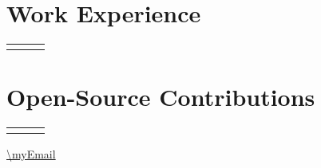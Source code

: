 \documentclass[jdlanctot]{mycv}
\begin{document}
\begin{paracol}{2}
\vspace{2em}

\phantom{turn the page}

\phantom{turn the page}
\switchcolumn
\small
\section*{Work Experience}
\begin{tabular}{r!{\hspace{2mm}\color{titlerulecolour}\vrule width 1pt\hspace{1mm}} p{0.5\textwidth} c}
    \\
    \vspace{-1em}
\end{tabular}
\vspace{1em}

\section*{Open-Source Contributions}
\begin{tabular}{r!{\hspace{2mm}\color{titlerulecolour}\vrule width 1pt\hspace{1mm}} p{0.5\textwidth} c}
    \vspace{-3em}
\end{tabular}
\vspace{1em}

\end{paracol}

\vfill{} %
\setlength{\parindent}{0pt}
\centering
\begin{minipage}[t]{\textwidth}
    \begin{center}\fontfamily{\sfdefault}\selectfont \color{black!70}
    {\small \myName {} \myJob {} \myLocation {} \myNumber {} \protect\url{\myEmail}
    }
    \end{center}
\end{minipage}
\end{document}
